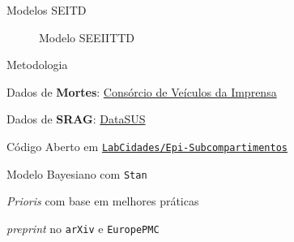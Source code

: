 \begin{frame}{Modelos SEITD}
\begin{figure}
{}
                \label{fig:SEEIITTD}
                \caption{Modelo SEEIITTD}
		\end{figure}
\end{frame}


\begin{frame}{Metodologia}
	\begin{vfilleditems}
	\item Dados de \textbf{Mortes}: \href{https://brasil.io/dataset/covid19/caso_full/}{Consórcio de Veículos da Imprensa}
	\item Dados de \textbf{SRAG}: \href{https://opendatasus.saude.gov.br/dataset/bd-srag-2020}{DataSUS}
	\item Código Aberto em \href{https://github.com/LabCidades/Epi-Subcompartimentos}{\texttt{LabCidades/Epi-Subcompartimentos}}
	\item Modelo Bayesiano com \texttt{Stan} \parencite{carpenterStanProbabilisticProgramming2017}
	\item \textit{Prioris} com base em melhores práticas \parencite{gelmanBayesianWorkflow2020,grinsztajnBayesianWorkflowDisease2021}
	\item \textit{preprint} no \texttt{arXiv} e \texttt{EuropePMC} \parencite{storopoliSimulationDrivenCOVID19Epidemiological2021}
	\end{vfilleditems}
\end{frame}

